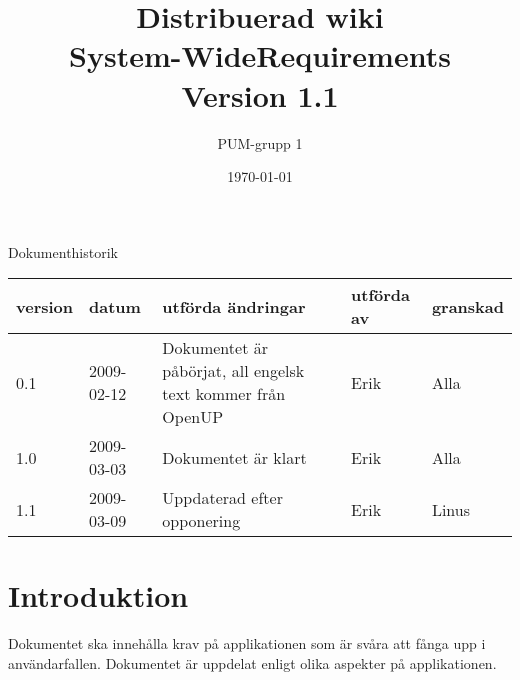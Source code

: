 

\ifpdf
\else
\fi

\title{Distribuerad wiki \\ System-WideRequirements \\ Version 1.1}
\author{PUM-grupp 1}
\date{\today}



\maketitle\thispagestyle{empty}

\newpage

{\centering \Large{Dokumenthistorik\\}}

\vspace{10pt}
\begin{tabularx}{\textwidth}{ |l|l|X|l|l| }
  \hline
    \textbf{version} & \textbf{datum} & \textbf{utförda ändringar} & \textbf{utförda av} & \textbf{granskad} \\
	\hline 
  0.1 & 2009-02-12 &  Dokumentet är påbörjat, all engelsk text kommer från OpenUP & Erik & Alla  \\
  \hline
  1.0 & 2009-03-03 & Dokumentet är klart & Erik & Alla \\
  \hline
  1.1 & 2009-03-09 & Uppdaterad efter opponering & Erik & Linus \\
  \hline 
\end{tabularx}

\newpage

\setcounter{tocdepth}{3}
\tableofcontents
\newpage

\section{Introduktion}
Dokumentet ska innehålla krav på applikationen som är svåra att fånga upp i användarfallen. Dokumentet är uppdelat enligt olika aspekter på applikationen. 


